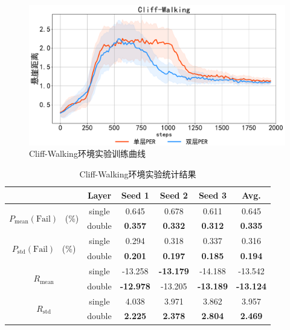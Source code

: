 \begin{figure}[t]
\centering
\includegraphics[width=\textwidth]{figures/cliffwalking.pdf}
\caption{Cliff-Walking环境实验训练曲线}
\label{fig:cliff-dis}
\end{figure}

\begin{table}[ht]
\centering
\caption{Cliff-Walking环境实验统计结果}
\begin{tabular}{c|c|c|c|c|c} 
\toprule
                                                    & Layer  & Seed 1           & Seed 2           & Seed 3           & Avg.              \\ 
\midrule
\multirow{2}{*}{$P_\text{mean}(\text{Fail})$~ (\%)} & single & 0.645            & 0.678            & 0.611            & 0.645             \\ 
\cline{2-6}
                                                    & double & \textbf{0.357}   & \textbf{0.332}   & \textbf{0.312}   & \textbf{0.335}    \\ 
\hline
\multirow{2}{*}{$P_\text{std}(\text{Fail})$~ (\%)}  & single & 0.294            & 0.318            & 0.337            & 0.316             \\ 
\cline{2-6}
                                                    & double & \textbf{0.201}   & \textbf{0.197}   & \textbf{0.185}   & \textbf{0.194}    \\ 
\hline
\multirow{2}{*}{$R_\text{mean}$}                    & single & -13.258          & \textbf{-13.179} & -14.188          & -13.542           \\ 
\cline{2-6}
                                                    & double & \textbf{-12.978} & -13.205          & \textbf{-13.189} & \textbf{-13.124}  \\ 
\hline
\multirow{2}{*}{$R_\text{std}$}                     & single & 4.038            & 3.971            & 3.862            & 3.957             \\ 
\cline{2-6}
                                                    & double & \textbf{2.225}   & \textbf{2.378}   & \textbf{2.804}   & \textbf{2.469}    \\
\bottomrule
\end{tabular}
\label{tab:cliff-stats}
\end{table}


